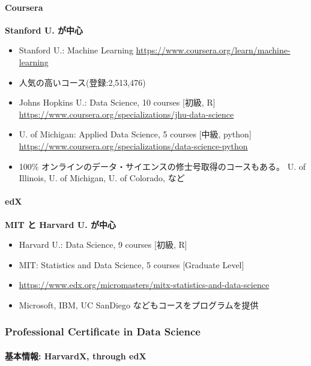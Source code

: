 \documentclass[
]{book}
\providecommand{\tightlist}{%
  \setlength{\itemsep}{0pt}\setlength{\parskip}{0pt}}
\theoremstyle{definition}
\theoremstyle{definition}
\theoremstyle{definition}
\theoremstyle{definition}
\theoremstyle{remark}
\begin{document}
\hypertarget{coursera}{%
\paragraph{Coursera}\label{coursera}}

\textbf{Stanford U. が中心}

\begin{itemize}
\tightlist
\item
  Stanford U.: Machine Learning \url{https://www.coursera.org/learn/machine-learning}
\item
  人気の高いコース(登録:2,513,476)
\item
  Johns Hopkins U.: Data Science, 10 courses {[}初級, R{]} \url{https://www.coursera.org/specializations/jhu-data-science}
\item
  U. of Michigan: Applied Data Science, 5 courses {[}中級, python{]} \url{https://www.coursera.org/specializations/data-science-python}
\item
  100\% オンラインのデータ・サイエンスの修士号取得のコースもある。 U. of Illinois, U. of Michigan, U. of Colorado, など
\end{itemize}

\hypertarget{edx}{%
\paragraph{edX}\label{edx}}

\textbf{MIT と Harvard U. が中心}

\begin{itemize}
\tightlist
\item
  Harvard U.: Data Science, 9 courses {[}初級, R{]}
\item
  MIT: Statistics and Data Science, 5 courses {[}Graduate Level{]}
\item
  \url{https://www.edx.org/micromasters/mitx-statistics-and-data-science}
\item
  Microsoft, IBM, UC SanDiego などもコースをプログラムを提供
\end{itemize}

\hypertarget{professional-certificate-in-data-science}{%
\subsubsection{Professional Certificate in Data Science}\label{professional-certificate-in-data-science}}

\hypertarget{ux57faux672cux60c5ux5831-harvardx-through-edx}{%
\paragraph{基本情報: HarvardX, through edX}\label{ux57faux672cux60c5ux5831-harvardx-through-edx}}
\end{document}
